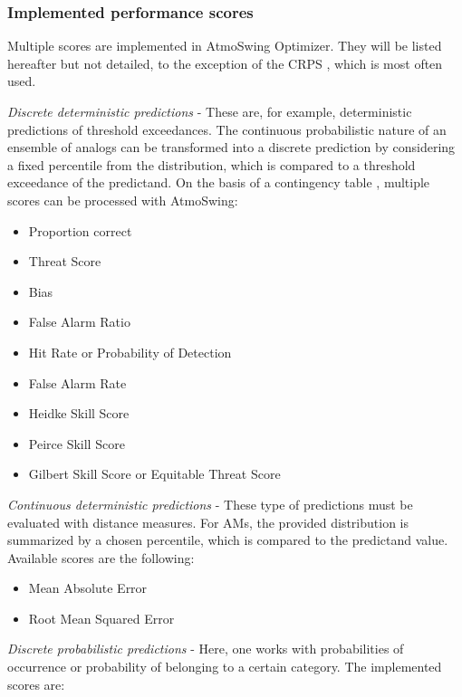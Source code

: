 \documentclass[review]{elsarticle}
\begin{document}
\subsubsection{Implemented performance scores}
\label{sec:scores}

Multiple scores are implemented in AtmoSwing Optimizer. They will be listed hereafter but not detailed, to the exception of the CRPS \citep[Continuous Ranked Probability Score,][]{Brown1974, Matheson1976, Hersbach2000}, which is most often used. 


\textit{Discrete deterministic predictions} - These are, for example, deterministic predictions of threshold exceedances. The continuous probabilistic nature of an ensemble of analogs can be transformed into a discrete prediction by considering a fixed percentile from the distribution, which is compared to a threshold exceedance of the predictand. On the basis of a contingency table \citep{Wilks2006}, multiple scores can be processed with AtmoSwing:

\begin{itemize}
	\item Proportion correct \citep{Finley1884}
	\item Threat Score \citep{Gilbert1884}
	\item Bias
	\item False Alarm Ratio
	\item Hit Rate or Probability of Detection
	\item False Alarm Rate
	\item Heidke Skill Score \citep{Heidke1926}
	\item Peirce Skill Score \citep{Peirce1884}
	\item Gilbert Skill Score or Equitable Threat Score \citep{Gilbert1884}
\end{itemize}


\textit{Continuous deterministic predictions} - These type of predictions must be evaluated with distance measures. For AMs, the provided distribution is summarized by a chosen percentile, which is compared to the predictand value. Available scores are the following:

\begin{itemize}
	\item Mean Absolute Error
	\item Root Mean Squared Error
\end{itemize}


\textit{Discrete probabilistic predictions} - Here, one works with probabilities of occurrence or probability of belonging to a certain category. The implemented scores are:
\end{document}

